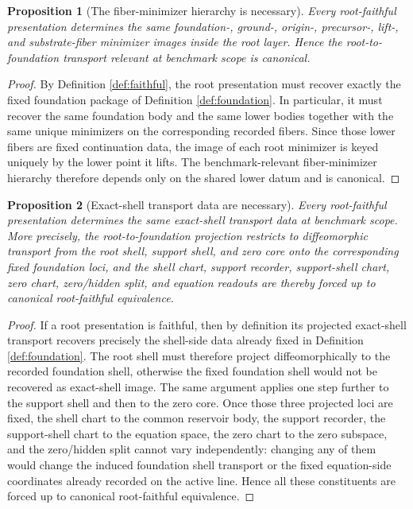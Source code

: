 \documentclass[11pt]{article}
\newtheorem{proposition}{Proposition}
\begin{document}
\begin{proposition}[The fiber-minimizer hierarchy is necessary]
\label{prop:minimizers}
Every root-faithful presentation determines the same foundation-, ground-, origin-, precursor-, lift-, and substrate-fiber minimizer images inside the root layer. Hence the root-to-foundation transport relevant at benchmark scope is canonical.
\end{proposition}

\begin{proof}
By Definition \ref{def:faithful}, the root presentation must recover exactly the fixed foundation package of Definition \ref{def:foundation}. In particular, it must recover the same foundation body and the same lower bodies together with the same unique minimizers on the corresponding recorded fibers. Since those lower fibers are fixed continuation data, the image of each root minimizer is keyed uniquely by the lower point it lifts. The benchmark-relevant fiber-minimizer hierarchy therefore depends only on the shared lower datum and is canonical.
\end{proof}

\begin{proposition}[Exact-shell transport data are necessary]
\label{prop:shell}
Every root-faithful presentation determines the same exact-shell transport data at benchmark scope. More precisely, the root-to-foundation projection restricts to diffeomorphic transport from the root shell, support shell, and zero core onto the corresponding fixed foundation loci, and the shell chart, support recorder, support-shell chart, zero chart, zero/hidden split, and equation readouts are thereby forced up to canonical root-faithful equivalence.
\end{proposition}

\begin{proof}
If a root presentation is faithful, then by definition its projected exact-shell transport recovers precisely the shell-side data already fixed in Definition \ref{def:foundation}. The root shell must therefore project diffeomorphically to the recorded foundation shell, otherwise the fixed foundation shell would not be recovered as exact-shell image. The same argument applies one step further to the support shell and then to the zero core. Once those three projected loci are fixed, the shell chart to the common reservoir body, the support recorder, the support-shell chart to the equation space, the zero chart to the zero subspace, and the zero/hidden split cannot vary independently: changing any of them would change the induced foundation shell transport or the fixed equation-side coordinates already recorded on the active line. Hence all these constituents are forced up to canonical root-faithful equivalence.
\end{proof}
\end{document}
